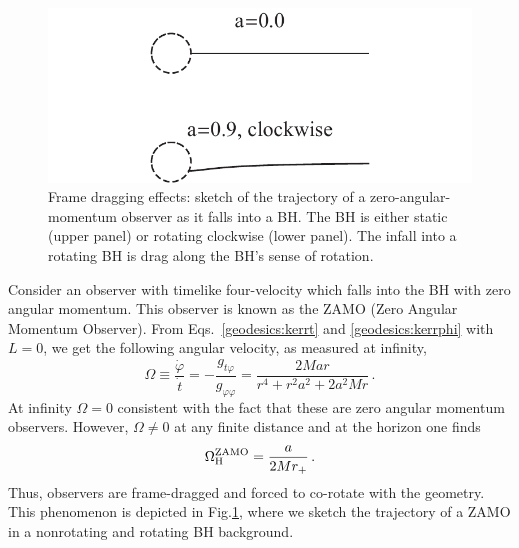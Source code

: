 \documentclass[11pt]{article}
\newcommand{\be}{\begin{equation}}
\newcommand{\ee}{\end{equation}}
\numberwithin{equation}{section} %
\begin{document}
%
\begin{figure}
\centerline{\includegraphics[height=6 cm] {FrameDragging}}
\caption{Frame dragging effects: sketch of the trajectory of a zero-angular-momentum observer as it falls into a BH.
The BH is either static (upper panel) or rotating clockwise (lower panel).
The infall into a rotating BH is drag along the BH's sense of rotation.} \label{fig:framedragging}
\end{figure}
%
Consider an observer with timelike four-velocity which falls into the BH with zero angular momentum. This observer is known as the ZAMO (Zero Angular Momentum Observer). From Eqs.~\eqref{geodesics:kerrt} and \eqref{geodesics:kerrphi} with $L=0$, we get the following angular velocity, as measured at infinity,
%
\be
\Omega \equiv \frac{\dot{\varphi}}{\dot{t}}=-\frac{g_{t\varphi}}{g_{\varphi\varphi}}=\frac{2Mar}{r^4+r^2a^2+2a^2Mr}\,.
\ee
%
At infinity $\Omega=0$ consistent with the fact that these are zero angular momentum observers. However, $\Omega\neq0$ at any finite distance and at the horizon one finds 
%
\be
\Omega_{\rm H}^{\rm ZAMO}=\frac{a}{2Mr_+}\,.
\ee
%
Thus, observers are frame-dragged and forced to co-rotate with the geometry. This phenomenon is depicted in Fig.\ref{fig:framedragging}, where we sketch the trajectory of a ZAMO in a nonrotating and rotating BH background. 
\end{document}
